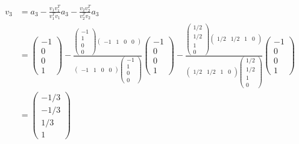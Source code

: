 \documentclass{article}
\begin{document}
\begin{align*}
    v_3 &= a_3 - \frac{v_1 v_1^T}{v_1^T v_1} a_3 - \frac{v_2 v_2^T}{v_2^T v_2} a_3 \\
    &= \begin{pmatrix} -1 \\ 0 \\ 0 \\ 1 \end{pmatrix} -
    \frac{\begin{pmatrix} -1 \\ 1 \\ 0 \\ 0 \end{pmatrix} \begin{pmatrix} -1
    & 1 & 0 & 0 \end{pmatrix}}{\begin{pmatrix} -1 & 1 & 0 & 0 \end{pmatrix}
    \begin{pmatrix} -1 \\ 1 \\ 0 \\ 0 \end{pmatrix}} \begin{pmatrix} -1 \\ 0
    \\ 0 \\ 1 \end{pmatrix} - \frac{\begin{pmatrix} 1/2 \\ 1/2 \\ 1 \\ 0
    \end{pmatrix} \begin{pmatrix} 1/2 & 1/2 & 1 & 0
    \end{pmatrix}}{\begin{pmatrix} 1/2 & 1/2 & 1 & 0 \end{pmatrix}
    \begin{pmatrix} 1/2 \\ 1/2 \\ 1 \\ 0 \end{pmatrix}} \begin{pmatrix} -1 \\ 0
    \\ 0 \\ 1 \end{pmatrix}\\
    &= \begin{pmatrix} -1/3 \\ -1/3 \\ 1/3 \\ 1 \end{pmatrix}
\end{align*}
\end{document}
